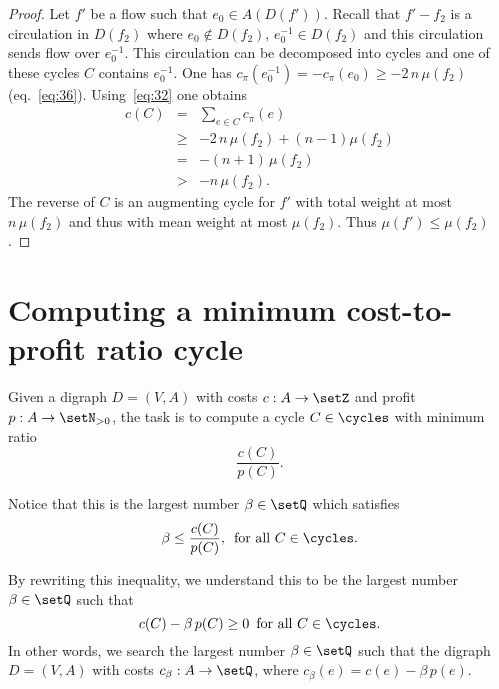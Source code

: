 \begin{proof}
  Let $f'$ be a flow such that $e_0\in A(D(f'))$. Recall that $f' - f_2$
  is a circulation in $D(f_2)$ where $e_0\notin D(f_2), \,e_0^{-1}\in D(f_2)$  and this
  circulation sends flow over $e_0^{-1}$. This circulation can be
  decomposed into cycles and one of these cycles $C$ contains
  $e_0^{-1}$.  One has $c_\pi(e_0^{-1}) = -c_\pi(e_0) \geq -  2 \, n \,
  \mu(f_2)$ (eq.~\eqref{eq:36}). Using~\eqref{eq:32} one obtains
  \begin{eqnarray}
    \label{eq:37}
    c(C) & = &  \sum_{e \in C} c_\pi(e) \\
         & \geq &  -  2 \, n \,  \mu(f_2) + (n-1) \mu(f_2) \\
         & = & - (n +1)\, \mu(f_2) \\
         & > & -n \, \mu(f_2). 
  \end{eqnarray}
  The reverse of $C$ is an augmenting cycle for $f'$ with total weight
  at most $n \, \mu(f_2)$ and thus with mean weight at most
  $\mu(f_2)$. Thus $\mu(f') \leq \mu(f_2)$. 
\end{proof}






\section{Computing a minimum cost-to-profit ratio cycle}
\label{sec:comp-minim-cost}

Given a digraph $D = (V,A)$ with costs $c:A\to\setZ$ and profit $p:A \to
\setN_{>0}$, the task is to compute a cycle $C \in \cycles$ with minimum
ratio 
\begin{equation}
  \label{eq:31}
  \frac{c(C)}{p(C)}.
\end{equation}

Notice that this is the largest number $\beta\in \setQ$ which satisfies 
\begin{equation}
  \beta\leq  \frac{c(C)}{p(C)}, \, \text{ for all } C \in \cycles. 
\end{equation}

By rewriting this inequality, we understand this to be the largest
number $\beta\in \setQ$ such that 
\begin{equation}
  c(C) - \beta\, p(C) \geq0 \, \text{ for all } C \in \cycles. 
\end{equation}
In other words, we search the largest number $\beta \in \setQ$ such that the
digraph $D= (V,A)$ with costs $c_\beta:A \to \setQ$, where 
$c_\beta(e) = c(e) - \beta\,p(e)$.  

